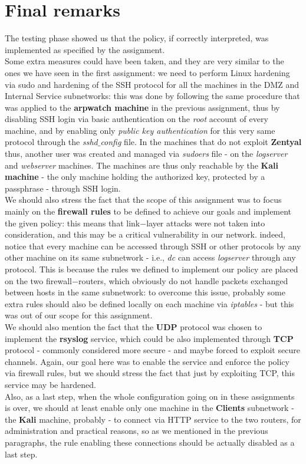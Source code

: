 \section{Final remarks}
The testing phase showed us that the policy, if correctly interpreted, was implemented as specified by the assignment.\\
Some extra measures could have been taken, and they are very similar to the ones we have seen in the first assignment: we need to perform Linux hardening via sudo and hardening of the SSH protocol for all the machines in the DMZ and Internal Service subnetworks: this was done by following the same procedure that was applied to the \textbf{arpwatch machine} in the previous assignment, thus by disabling SSH login via basic authentication on the \textit{root} account of every machine, and by enabling only \textit{public key authentication} for this very same protocol through the \textit{sshd$\_$config} file. In the machines that do not exploit \textbf{Zentyal} thus, another user was created and managed via \textit{sudoers} file - on the \textit{logserver} and \textit{webserver} machines. The machines are thus only reachable by the \textbf{Kali machine} - the only machine holding the authorized key, protected by a passphrase - through SSH login.\\
We should also stress the fact that the scope of this assignment was to focus mainly on the \textbf{firewall rules} to be defined to achieve our goals and implement the given policy: this means that link$-$layer attacks were not taken into consideration, and this may be a critical vulnerability in our network. indeed, notice that every machine can be accessed through SSH or other protocols by any other machine on its same subnetwork - i.e., \textit{dc} can access \textit{logserver} through any protocol. This is because the rules we defined to implement our policy are placed on the two firewall$-$routers, which obviously do not handle packets exchanged between hosts in the same subnetwork: to overcome this issue, probably some extra rules should also be defined locally on each machine via \textit{iptables} - but this was out of our scope for this assignment.\\
We should also mention the fact that the \textbf{UDP} protocol was chosen to implement the \textbf{rsyslog} service, which could be also implemented through \textbf{TCP} protocol - commonly considered more secure - and maybe forced to exploit secure channels. Again, our goal here was to enable the service and enforce the policy via firewall rules, but we should stress the fact that just by exploiting TCP, this service may be hardened.\\
Also, as a last step, when the whole configuration going on in these assignments is over, we should at least enable only one machine in the \textbf{Clients} subnetwork - the \textbf{Kali} machine, probably - to connect via HTTP service to the two routers, for administration and practical reasons, so as we mentioned in the previous paragraphs, the rule enabling these connections should be actually disabled as a last step.
